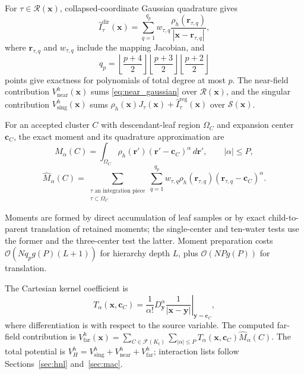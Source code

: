 \documentclass[a4paper,pdflatex,sn-mathphys-num]{sn-jnl}
\theoremstyle{thmstyleone}
\begin{document}
For $\tau\in\mathcal R(\mathbf x)$, collapsed-coordinate Gaussian quadrature gives
\begin{equation}
\label{eq:near_gaussian}
\widehat I_{\tau}^{\mathrm{dir}}(\mathbf x)
=
\sum_{q=1}^{q_p}
w_{\tau,q}
\frac{\rho_h(\mathbf r_{\tau,q})}
     {|\mathbf x-\mathbf r_{\tau,q}|},
\end{equation}
where $\mathbf r_{\tau,q}$ and $w_{\tau,q}$ include the mapping Jacobian, and
\[
q_p=
\left\lfloor\frac{p+4}{2}\right\rfloor
\left\lfloor\frac{p+3}{2}\right\rfloor
\left\lfloor\frac{p+2}{2}\right\rfloor
\]
points give exactness for polynomials of total degree at most $p$. The near-field contribution $V_{\mathrm{near}}^h(\mathbf x)$ sums \eqref{eq:near_gaussian} over $\mathcal R(\mathbf x)$, and the singular contribution $V_{\mathrm{sing}}^h(\mathbf x)$ sums $\rho_h(\mathbf x)J_\tau(\mathbf x)+\widehat I_\tau^{\mathrm{reg}}(\mathbf x)$ over $\mathcal S(\mathbf x)$.

For an accepted cluster $C$ with descendant-leaf region $\Omega_C$ and expansion center $\mathbf c_C$, the exact moment and its quadrature approximation are
\begin{equation}
\label{eq:multipole_moment}
M_\alpha(C)
=
\int_{\Omega_C}
\rho_h(\mathbf r')
(\mathbf r'-\mathbf c_C)^\alpha
\,d\mathbf r',
\qquad
|\alpha|\le P,
\end{equation}
\[
\widehat M_\alpha(C)=
\sum_{\substack{\tau\text{ an integration piece}\\\tau\subset\Omega_C}}
\sum_{q=1}^{q_p}w_{\tau,q}\rho_h(\mathbf r_{\tau,q})
(\mathbf r_{\tau,q}-\mathbf c_C)^\alpha.
\]

Moments are formed by direct accumulation of leaf samples or by exact child-to-parent translation of retained moments; the single-center and ten-water tests use the former and the three-center test the latter. Moment preparation costs $\mathcal O(Nq_pg(P)(L+1))$ for hierarchy depth $L$, plus $\mathcal O(NPg(P))$ for translation.

The Cartesian kernel coefficient is
\begin{equation}
\label{eq:kernel_coefficient}
T_\alpha(\mathbf x,\mathbf c_C)
=
\frac{1}{\alpha!}
\left.
D_{\mathbf y}^{\alpha}
\frac{1}{|\mathbf x-\mathbf y|}
\right|_{\mathbf y=\mathbf c_C},
\end{equation}
where differentiation is with respect to the source variable. The computed far-field contribution is
$V_{\mathrm{far}}^h(\mathbf x)=\sum_{C\in\mathcal F(K_t)}\sum_{|\alpha|\le P}
T_\alpha(\mathbf x,\mathbf c_C)\widehat M_\alpha(C)$.
The total potential is $V_H^h=V_{\mathrm{sing}}^h+V_{\mathrm{near}}^h+V_{\mathrm{far}}^h$; interaction lists follow Sections~\ref{sec:hnl} and~\ref{sec:mac}.
\end{document}
